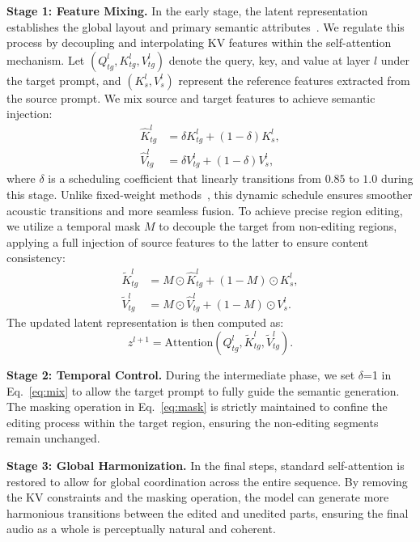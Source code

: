 \noindent \textbf{Stage 1: Feature Mixing.} In the early stage, the latent representation establishes the global layout and primary semantic attributes~\cite{jiang2025controlaudio,chen2025humo}. We regulate this process by decoupling and interpolating KV features within the self-attention mechanism. Let $(Q_{tg}^l, K_{tg}^l, V_{tg}^l)$ denote the query, key, and value at layer $l$ under the target prompt, and $(K_s^l, V_s^l)$ represent the reference features extracted from the source prompt. We mix source and target features to achieve semantic injection:
\begin{equation}
\begin{aligned}
\hat{K}_{tg}^l &= \delta K_{tg}^l + (1-\delta)K_s^l, \\
\hat{V}_{tg}^l &= \delta V_{tg}^l + (1-\delta)V_s^l,
\end{aligned}
\label{eq:mix}
\end{equation}
where $\delta$ is a scheduling coefficient that linearly transitions from $0.85$ to $1.0$ during this stage. Unlike fixed-weight methods~\cite{ouyang2025proedit}, this dynamic schedule ensures smoother acoustic transitions and more seamless fusion. To achieve precise region editing, we utilize a temporal mask $M$ to decouple the target from non-editing regions, applying a full injection of source features to the latter to ensure content consistency:
\begin{equation}
\begin{aligned}
\tilde{K}_{tg}^l &= M \odot \hat{K}_{tg}^l + (1-M)\odot K_s^l, \\
\tilde{V}_{tg}^l &= M \odot \hat{V}_{tg}^l + (1-M)\odot V_s^l.
\end{aligned}
\label{eq:mask}
\end{equation}
The updated latent representation is then computed as:
\begin{equation}
z^{l+1} = \mathrm{Attention}(Q_{tg}^l, \tilde{K}_{tg}^l, \tilde{V}_{tg}^l).
\end{equation}

\noindent \textbf{Stage 2: Temporal Control.} During the intermediate phase, we set $\delta$=1 in Eq.~\ref{eq:mix} to allow the target prompt to fully guide the semantic generation. The masking operation in Eq.~\ref{eq:mask} is strictly maintained to confine the editing process within the target region, ensuring the non-editing segments remain unchanged.

\noindent \textbf{Stage 3: Global Harmonization.} In the final steps, standard self-attention is restored to allow for global coordination across the entire sequence. By removing the KV constraints and the masking operation, the model can generate more harmonious transitions between the edited and unedited parts, ensuring the final audio as a whole is perceptually natural and coherent.

